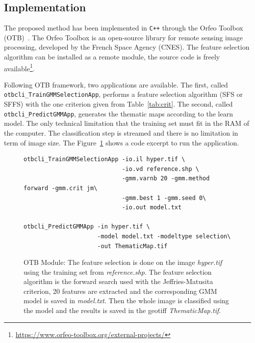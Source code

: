\documentclass[journal]{IEEEtran}
\begin{document}
    \subsection{Implementation}
    \label{sec:otb-module}

    The proposed  method has been implemented  in \texttt{C++} through
    the  Orfeo  Toolbox (OTB)~\cite{christophe2008orfeo}.   The  Orfeo
    Toolbox  is  an  open-source  library  for  remote  sensing  image
    processing,  developed by  the  French Space  Agency (CNES).   The
    feature selection algorithm  can be installed as  a remote module,
    the           source            code           is           freely
    available\footnote{\url{https://www.orfeo-toolbox.org/external-projects/}}.

    Following  OTB framework,  two  applications  are available.   The
    first,  called  \texttt{otbcli\_TrainGMMSelectionApp}, performs  a
    feature selection algorithm  (SFS or SFFS) with  the one criterion
    given      from Table~\ref{tab:crit}.       The      second,      called
    \texttt{otbcli\_PredictGMMApp},   generates   the  thematic   maps
    according to the  learn model. The only  technical limitation that
    the  training set  must  fit  in the  RAM  of  the computer.   The
    classification step is streamed and there is no limitation in term
    of image  size. The Figure~\ref{fig:otb:ffs} shows  a code excerpt
    to run the application.

    \begin{figure} 
        \centering %
        \begin{verbatim} 
otbcli_TrainGMMSelectionApp -io.il hyper.tif \
                            -io.vd reference.shp \
                            -gmm.varnb 20 -gmm.method forward -gmm.crit jm\
                            -gmm.best 1 -gmm.seed 0\
                            -io.out model.txt

otbcli_PredictGMMApp -in hyper.tif \
                     -model model.txt -modeltype selection\
                     -out ThematicMap.tif
        \end{verbatim}
        \caption{OTB Module: The feature selection is done on the image \emph{hyper.tif} using the training set from \emph{reference.shp}. The feature selection algorithm is the forward search used with the Jeffries-Matusita criterion, 20 features are extracted and the corresponding GMM model is saved in \emph{model.txt}. Then the whole image is classified using the model and the results is saved in the geotiff \emph{ThematicMap.tif}.}
        \label{fig:otb:ffs}
    \end{figure}
\end{document}
